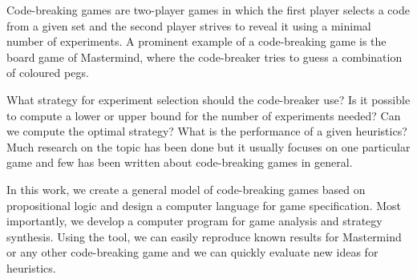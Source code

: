 \begin{ThesisAbstract}
Code-breaking games are two-player games in which the first player selects
  a code from a given set and the second player strives to reveal it using a
  minimal number of experiments.
A prominent example of a code-breaking game is the board game of Mastermind,
  where the code-breaker tries to guess a combination of coloured pegs.

What strategy for experiment selection should the code-breaker use?
Is it possible to compute a lower or upper bound for the number of experiments needed?
Can we compute the optimal strategy?
What is the performance of a given heuristics?
Much research on the topic has been done but it usually focuses
  on one particular game and few has been written about code-breaking
  games in general.

In this work, we create a general model of code-breaking games
  based on propositional logic
  and design a computer language for game specification.
Most importantly, we develop a computer program for game analysis
  and strategy synthesis.
Using the tool, we can easily reproduce known results for Mastermind or
  any other code-breaking game and we can quickly evaluate new ideas
  for heuristics.
\end{ThesisAbstract}

\MainMatter
\setlength{\parindent}{0pt}

\setcounter{secnumdepth}{1}
\setcounter{tocdepth}{2}
\begin{spacing}{1.2} \normalsize
\tableofcontents
\end{spacing}










\pagestyle{plain}
\printbibliography

